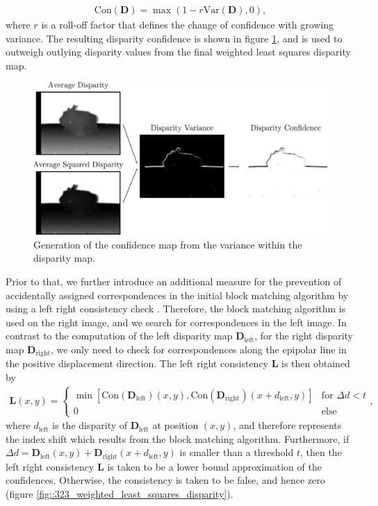 \begin{align}
	\text{Con}(\bm{D}) = \max\left(1-r\text{Var}(\bm{D}),0\right),
\end{align}
where $r$ is a roll-off factor that defines the change of confidence with growing variance. The resulting disparity confidence is shown in figure \ref{fig::323_confidence_map}, and is used to outweigh outlying disparity values from the final weighted least squares disparity map. 
\begin{figure}[h]
	\centering
	\includegraphics[scale=.28]{chapters/03_background/img/confidence_map.png}
	\caption{Generation of the confidence map from the variance within the disparity map.}
	\label{fig::323_confidence_map}
\end{figure}
Prior to that, we further introduce an additional measure for the prevention of accidentally assigned correspondences in the initial block matching algorithm by using a left right consistency check \cite{egnal2004stereo}. Therefore, the block matching algorithm is used on the right image, and we search for correspondences in the left image. In contrast to the computation of the left disparity map $\bm{D}_\text{left}$, for the right disparity map $\bm{D}_\text{right}$, we only need to check for correspondences along the epipolar line in the positive displacement direction. The left right consistency $\bm{L}$ is then obtained by 
\begin{align}
	\bm{L}(x, y) = 
	\begin{cases}
	\min \left[\text{Con}(\bm{D}_\text{left})(x, y), \text{Con}(\bm{D}_\text{right})(x + d_\text{left}, y)\right] & \text{for } \Delta d < t  \\
	0 & \text{else}
	\end{cases},
\end{align}
where $d_\text{left}$ is the disparity of $\bm{D}_\text{left}$ at position $(x,y)$, and therefore represents the index shift which results from the block matching algorithm. Furthermore, if $\Delta d = \bm{D}_\text{left}(x, y) + \bm{D}_\text{right}(x + d_\text{left}, y)$ is smaller than a threshold $t$, then the left right consistency $\bm{L}$ is taken to be a lower bound approximation of the confidences. Otherwise, the consistency is taken to be false, and hence zero (figure \ref{fig::323_weighted_least_squares_disparity}). 

